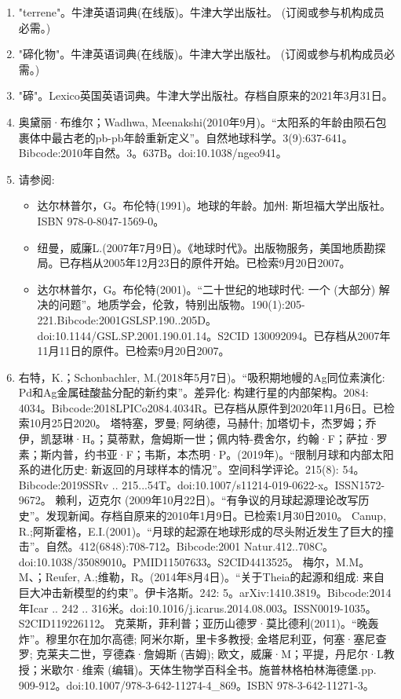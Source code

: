 \begin{enumerate}
\item "terrene"。牛津英语词典(在线版)。牛津大学出版社。 (订阅或参与机构成员必需。)
\item "碲化物"。牛津英语词典(在线版)。牛津大学出版社。 (订阅或参与机构成员必需。)
\item "碲"。Lexico英国英语词典。牛津大学出版社。存档自原来的2021年3月31日。
\item 奥黛丽·布维尔；Wadhwa, Meenakshi(2010年9月)。“太阳系的年龄由陨石包裹体中最古老的pb-pb年龄重新定义”。自然地球科学。3(9):637-641。Bibcode:2010年自然。3。637B。doi:10.1038/ngeo941。
\item 请参阅:
\begin{itemize}
\item 达尔林普尔，G。布伦特(1991)。地球的年龄。加州: 斯坦福大学出版社。ISBN 978-0-8047-1569-0。
\item 纽曼，威廉L.(2007年7月9日)。《地球时代》。出版物服务，美国地质勘探局。已存档从2005年12月23日的原件开始。已检索9月20日2007。
\item 达尔林普尔，G。布伦特(2001)。“二十世纪的地球时代: 一个 (大部分) 解决的问题”。地质学会，伦敦，特别出版物。190(1):205-221.Bibcode:2001GSLSP.190..205D。doi:10.1144/GSL.SP.2001.190.01.14。S2CID 130092094。已存档从2007年11月11日的原件。已检索9月20日2007。
\end{itemize}
\item 右特，K.；Schonbachler, M.(2018年5月7日)。“吸积期地幔的Ag同位素演化: Pd和Ag金属硅酸盐分配的新约束”。差异化: 构建行星的内部架构。2084: 4034。Bibcode:2018LPICo2084.4034R。已存档从原件到2020年11月6日。已检索10月25日2020。
 塔特塞，罗曼; 阿纳德，马赫什; 加塔切卡，杰罗姆；乔伊，凯瑟琳·H。；莫蒂默，詹姆斯一世；佩内特-费舍尔，约翰·F；萨拉·罗素；斯内普，约书亚·F；韦斯，本杰明·P。(2019年)。“限制月球和内部太阳系的进化历史: 新返回的月球样本的情况”。空间科学评论。215(8): 54。Bibcode:2019SSRv .. 215...54T。doi:10.1007/s11214-019-0622-x。ISSN1572-9672。 
 赖利，迈克尔 (2009年10月22日)。“有争议的月球起源理论改写历史”。发现新闻。存档自原来的2010年1月9日。已检索1月30日2010。
 Canup, R.;阿斯霍格，E.I.(2001)。“月球的起源在地球形成的尽头附近发生了巨大的撞击”。自然。412(6848):708-712。Bibcode:2001 Natur.412..708C。doi:10.1038/35089010。PMID11507633。S2CID4413525。  
 梅尔，M.M。M、；Reufer, A.;维勒，R。(2014年8月4日)。“关于Theia的起源和组成: 来自巨大冲击新模型的约束”。伊卡洛斯。242: 5。arXiv:1410.3819。Bibcode:2014年Icar .. 242 .. 316米。doi:10.1016/j.icarus.2014.08.003。ISSN0019-1035。S2CID119226112。  
 克莱斯，菲利普；亚历山德罗·莫比德利(2011)。“晚轰炸”。穆里尔在加尔高德; 阿米尔斯，里卡多教授; 金塔尼利亚，何塞·塞尼查罗; 克莱夫二世，亨德森·詹姆斯 (吉姆); 欧文，威廉·M；平提，丹尼尔·L教授；米歇尔·维索 (编辑)。天体生物学百科全书。施普林格柏林海德堡.pp. 909-912。doi:10.1007/978-3-642-11274-4_869。ISBN 978-3-642-11271-3。

\end{enumerate}
